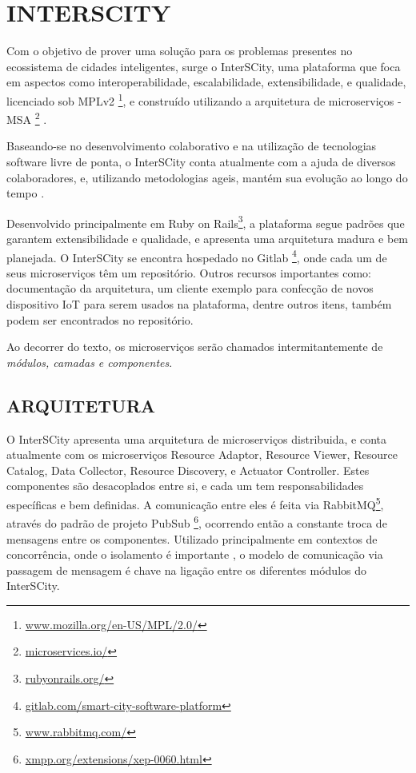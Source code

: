 \chapter[INTERSCITY]{INTERSCITY}

Com o objetivo de prover uma solução para os problemas presentes no ecossistema
de cidades inteligentes, surge o InterSCity, uma plataforma que foca em
aspectos como interoperabilidade, escalabilidade, extensibilidade, e qualidade,
licenciado sob
MPLv2 \footnote{\url{www.mozilla.org/en-US/MPL/2.0/}}, e construído
utilizando a arquitetura de microserviços -
MSA \footnote{\url{microservices.io/}} \cite{delesposte2017}.

Baseando-se no desenvolvimento colaborativo e na utilização de tecnologias
software livre de ponta, o InterSCity conta atualmente com a ajuda de diversos
colaboradores, e, utilizando metodologias ageis, mantém sua evolução ao longo
do tempo \cite{delesposte2017}.

Desenvolvido principalmente em
Ruby on Rails\footnote{\url{rubyonrails.org/}},
a plataforma segue padrões que garantem extensibilidade e qualidade, e
apresenta uma arquitetura madura e bem planejada. O InterSCity se encontra
hospedado no Gitlab \footnote{\url{gitlab.com/smart-city-software-platform}},
onde cada um de seus microserviços têm um repositório. Outros recursos
importantes como: documentação da arquitetura, um cliente exemplo para
confecção de novos dispositivo IoT para serem usados na plataforma, dentre
outros itens, também podem ser encontrados no repositório.

Ao decorrer do texto, os microserviços serão chamados intermitantemente de
\textit{módulos, camadas e componentes}. %

\section{ARQUITETURA}

O InterSCity apresenta uma arquitetura de microserviços distribuida, e conta
atualmente com os microserviços Resource Adaptor, Resource Viewer,
Resource Catalog, Data Collector, Resource Discovery, e Actuator Controller.
Estes componentes são desacoplados entre si, e cada um tem
responsabilidades específicas e bem definidas. A comunicação entre eles é
feita via RabbitMQ\footnote{\url{www.rabbitmq.com/}}, através
do padrão de projeto PubSub \footnote{\url{xmpp.org/extensions/xep-0060.html}},
ocorrendo então a constante troca de mensagens entre os componentes. Utilizado
principalmente em contextos de concorrência, onde o isolamento é
importante \cite{armstrong2003}, o modelo de comunicação via passagem de
mensagem é chave na ligação entre os diferentes módulos do InterSCity.

